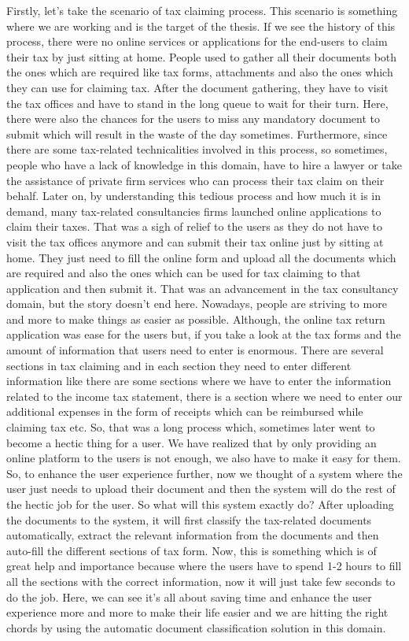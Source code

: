 Firstly, let's take the scenario of tax claiming process. This scenario is something where we are working and is the target of the thesis. If we see the history of this process, there were no online services or applications for the end-users to claim their tax by just sitting at home. People used to gather all their documents both the ones which are required like tax forms, attachments and also the ones which they can use for claiming tax. After the document gathering, they have to visit the tax offices and have to stand in the long queue to wait for their turn. Here, there were also the chances for the users to miss any mandatory document to submit which will result in the waste of the day sometimes. Furthermore, since there are some tax-related technicalities involved in this process, so sometimes, people who have a lack of knowledge in this domain, have to hire a lawyer or take the assistance of private firm services who can process their tax claim on their behalf. Later on, by understanding this tedious process and how much it is in demand, many tax-related consultancies firms launched online applications to claim their taxes. That was a sigh of relief to the users as they do not have to visit the tax offices anymore and can submit their tax online just by sitting at home. They just need to fill the online form and upload all the documents which are required and also the ones which can be used for tax claiming to that application and then submit it. That was an advancement in the tax consultancy domain, but the story doesn't end here. Nowadays, people are striving to more and more to make things as easier as possible. Although, the online tax return application was ease for the users but, if you take a look at the tax forms and the amount of information that users need to enter is enormous. There are several sections in tax claiming and in each section they need to enter different information like there are some sections where we have to enter the information related to the income tax statement, there is a section where we need to enter our additional expenses in the form of receipts which can be reimbursed while claiming tax etc. So, that was a long process which, sometimes later went to become a hectic thing for a user. We have realized that by only providing an online platform to the users is not enough, we also have to make it easy for them. So, to enhance the user experience further, now we thought of a system where the user just needs to upload their document and then the system will do the rest of the hectic job for the user. So what will this system exactly do? After uploading the documents to the system, it will first classify the tax-related documents automatically, extract the relevant information from the documents and then auto-fill the different sections of tax form. Now, this is something which is of great help and importance because where the users have to spend 1-2 hours to fill all the sections with the correct information, now it will just take few seconds to do the job. Here, we can see it's all about saving time and enhance the user experience more and more to make their life easier and we are hitting the right chords by using the automatic document classification solution in this domain.
